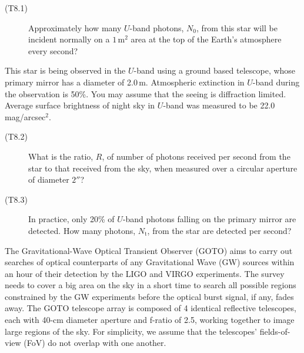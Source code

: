 \begin{description}
\item[(T8.1)] Approximately how many $U$-band photons, $N_0$, from this star
  will be incident normally on a $1\,\mathrm{m}^2$ area at the top of the
  Earth's atmosphere every second?
\end{description}

This star is being observed in the $U$-band using a ground based telescope,
whose primary mirror has a diameter of 2.0\,m. Atmospheric extinction in
$U$-band during the observation is 50\%. You may assume that the seeing is
diffraction limited. Average surface brightness of night sky in $U$-band was
measured to be 22.0\,mag/arcsec$^2$.

\begin{description}
\item[(T8.2)] What is the ratio, $R$, of number of photons received per second
  from the star to that received from the sky, when measured over a circular
  aperture of diameter $2''$?
\item[(T8.3)] In practice, only 20\% of $U$-band photons falling on the primary
  mirror are detected. How many photons, $N_{\mathrm{t}}$, from the star are
  detected per second?
\end{description}

The Gravitational-Wave Optical Transient Observer (GOTO) aims to carry out
searches of optical counterparts of any Gravitational Wave (GW) sources within
an hour of their detection by the LIGO and VIRGO experiments. The survey needs
to cover a big area on the sky in a short time to search all possible regions
constrained by the GW experiments before the optical burst signal, if any,
fades away. The GOTO telescope array is composed of 4 identical reflective
telescopes, each with 40-cm diameter aperture and f-ratio of 2.5, working
together to image large regions of the sky. For simplicity, we assume that the
telescopes' fields-of-view (FoV) do not overlap with one another.

